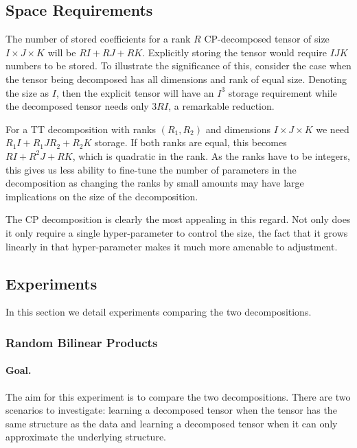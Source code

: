 
\subsection{Space Requirements}
The number of stored coefficients for a rank \(R\) CP-decomposed tensor of size 
\(I \times J \times K\) will be \(RI + RJ + RK\). Explicitly storing the tensor would require
\(IJK\) numbers to be stored. To illustrate the significance of this, consider the case when
the tensor being decomposed has all dimensions and rank of equal size. Denoting the size as
\(I\), then the explicit tensor will have an \(I^3\) storage requirement while the decomposed
tensor needs only \(3RI\), a remarkable reduction.

For a TT decomposition with ranks \((R_1, R_2)\) and dimensions \(I \times J \times K\) we need
\(R_1I + R_1JR_2 + R_2K\) storage. If both ranks are equal, this becomes \(RI + R^2J + RK\), which
is quadratic in the rank. As the ranks have to be integers, this gives us less ability to fine-tune the
number of parameters in the decomposition as changing the ranks by small amounts may have large
implications on the size of the decomposition.

The CP decomposition is clearly the most appealing in this regard. Not only does it only require a
single hyper-parameter to control the size, the fact that it grows linearly in that hyper-parameter
makes it much more amenable to adjustment.

\subsection{Experiments}
In this section we detail experiments comparing the two decompositions.

\subsubsection{Random Bilinear Products}\label{sec:randbilin}
\paragraph{Goal.}
The aim for this experiment is to compare the two decompositions. There are two scenarios to
investigate: learning a decomposed tensor when the tensor has the same structure as the data and
learning a decomposed tensor when it can only approximate the underlying structure. 

